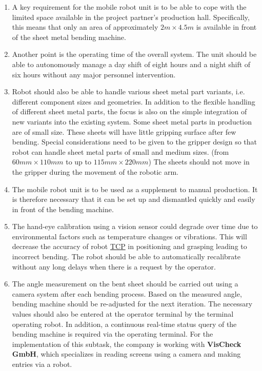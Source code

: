 \begin{enumerate}
    \item A key requirement for the mobile robot unit is to be able to cope with the limited space available in the
    project partner's production hall. Specifically, this means that only an area of approximately $2 m \times 4.5 m$ is
    available in front of the sheet metal bending machine.

    \item Another point is the operating time of the overall system. The unit should be able to autonomously
    manage a day shift of eight hours and a night shift of six hours without any major personnel
    intervention.

    \item Robot should also be able to handle various sheet metal part variants, i.e. different component sizes and
    geometries. In addition to the flexible handling of different sheet metal parts, the focus is also on the
    simple integration of new variants into the existing system. Some sheet metal parts in production are
    of small size. These sheets will have little gripping surface after few bending. Special considerations need to be given to the
    gripper design so that robot can handle sheet metal parts of small and medium sizes. (from $60 mm \times 110 mm$ to up to $115 mm \times 220 mm$)
    The sheets should not move in the gripper during the movement of the robotic arm.

    \item 
    The mobile robot unit is to be used as a supplement to manual production. It is therefore necessary
    that it can be set up and dismantled quickly and easily in front of the bending machine.

    \item The hand-eye calibration using a vision sensor could degrade over time due to environmental factors such as temperature changes or vibrations. \cite{Bahadir2024}
    This will decrease the accuracy of robot \hyperref[acro:TCP]{TCP} in positioning and grasping leading to incorrect bending.
    The robot should be able to automatically recalibrate without any long delays when there is a request by the operator.
    
    \item The angle measurement on the bent sheet should be carried out using a camera system
    after each bending process. Based on the measured angle, bending machine should be re-adjusted for the next iteration. The
    necessary values should also be entered at the operator terminal by the terminal operating robot. In addition, a
    continuous real-time status query of the bending machine is required via the operating terminal. For
    the implementation of this subtask, the company is working with \textbf{VisCheck GmbH}, which specializes in
    reading screens using a camera and making entries via a robot.
    
\end{enumerate}






